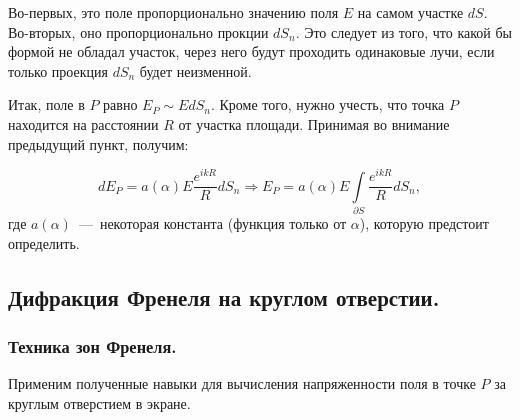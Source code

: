 \documentclass[11pt,a4paper]{article}
\numberwithin{equation}{section}
\begin{document}
Во-первых, это поле пропорционально значению поля $E$ на самом участке
$dS$. Во-вторых, оно пропорционально прокции $dS_n$. Это следует из
того, что какой бы формой не обладал участок, через него будут
проходить одинаковые лучи, если только проекция $dS_n$ будет
неизменной.

Итак, поле в $P$ равно $E_P \sim E dS_n$. Кроме того, нужно учесть,
что точка $P$ находится на расстоянии $R$ от участка площади. Принимая
во внимание предыдущий пункт, получим:

\begin{equation}
  dE_P = a(\alpha) E\frac{e^{ikR}}{R} dS_n \Rightarrow E_P = a(\alpha) E \int\limits_{\partial S} \frac{e^{ikR}}{R} dS_n,
\end{equation}
где $a(\alpha)$~---~некоторая константа (функция только от $\alpha$),
которую предстоит определить.

\subsection{Дифракция Френеля на круглом отверстии.}
\label{sec:diffraction_round}
\subsubsection{Техника зон Френеля.}
\label{sec:fresnel_zones}
Применим полученные навыки для вычисления напряженности поля в точке $P$ за круглым отверстием в экране. 

\begin{figure}
  \begin{center}
  \end{center}
  \label{fig:diffraction_round}
\end{figure}
\end{document}
